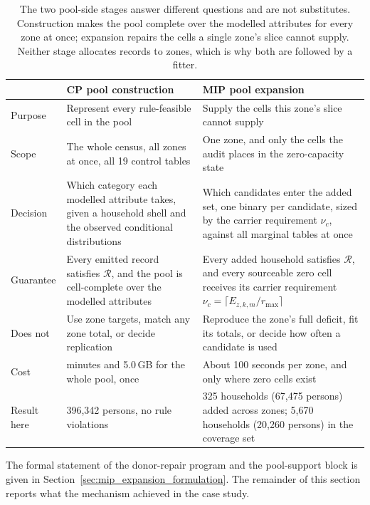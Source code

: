 \begin{table}[h!]
\centering
\caption{The two pool-side stages answer different questions and are not
substitutes. Construction makes the pool complete over the modelled attributes for
every zone at once; expansion repairs the cells a single zone's slice cannot supply.
Neither stage allocates records to zones, which is why both are followed by a fitter.}
\label{tab:cp_vs_mip}
\footnotesize
\setlength{\tabcolsep}{5pt}
\begin{tabular}{@{}>{\raggedright\arraybackslash}p{1.7cm}
                 >{\raggedright\arraybackslash}p{5.6cm}
                 >{\raggedright\arraybackslash}p{6.3cm}@{}}
\toprule
 & \textbf{CP pool construction} & \textbf{MIP pool expansion} \\
\midrule
Purpose & Represent every rule-feasible cell in the pool &
Supply the cells this zone's slice cannot supply \\
Scope & The whole census, all zones at once, all 19 control tables &
One zone, and only the cells the audit places in the zero-capacity state \\
Decision & Which category each modelled attribute takes, given a household shell and the
observed conditional distributions & Which candidates enter the added set, one binary
per candidate, sized by the carrier requirement $\nu_c$, against all marginal tables at once \\
Guarantee & Every emitted record satisfies $\mathcal{R}$, and the pool is cell-complete
over the modelled attributes & Every added household satisfies $\mathcal{R}$, and every
sourceable zero cell receives its carrier requirement $\nu_c=\lceil E_{z,k,m}/r_{\max}\rceil$ \\
Does not & Use zone targets, match any zone total, or decide replication & Reproduce the
zone's full deficit, fit its totals, or decide how often a candidate is used \\
Cost & 27.1 minutes and 5.0\,GB for the whole pool, once & About 100 seconds per zone,
and only where zero cells exist \\
Result here & 1{,}396{,}342 persons, no rule violations & 19{,}325 households
(67{,}475 persons) added across \ExpZones{} zones; 5{,}670 households
(20{,}260 persons) in the coverage set \\
\bottomrule
\end{tabular}
\end{table}

The formal statement of the donor-repair program and the pool-support block is given in Section~\ref{sec:mip_expansion_formulation}. The remainder of this section reports what the mechanism achieved in the case study.

